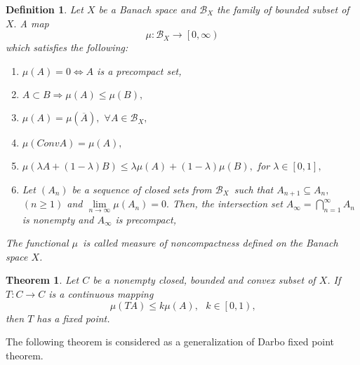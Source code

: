\documentclass{amsart}
\newtheorem{theorem}{Theorem}
\theoremstyle{plain}
\newtheorem{definition}{Definition}
\numberwithin{equation}{section}
\begin{document}
\begin{definition}
\cite{banas2} Let $X$ be a Banach space and $\mathcal{B}_{X}$ the family of
bounded subset of $X.$ A map\begin{equation*}
\mu :\mathcal{B}_{X}\rightarrow \left[ 0,\infty \right)
\end{equation*}
which satisfies the following:

\begin{enumerate}
\item $\mu \left( A\right) =0\Leftrightarrow A$ is a precompact set,

\item $A\subset B\Rightarrow \mu \left( A\right) \leqslant \mu \left(
B\right) ,$

\item $\mu \left( A\right) =\mu \left( \overline{A}\right) ,$ $\forall A\in 
\mathcal{B}_{X},$

\item $\mu \left( ConvA\right) =\mu \left( A\right) ,$

\item $\mu \left( \lambda A+\left( 1-\lambda \right) B\right) \leqslant
\lambda \mu \left( A\right) +\left( 1-\lambda \right) \mu \left( B\right) ,$
for $\lambda \in \left[ 0,1\right] ,$

\item Let $\left( A_{n}\right) $ be a sequence of closed sets from $\mathcal{B}_{X}$\ such that $A_{n+1}\subseteq A_{n},$ $\left( n\geqslant 1\right) $
and $\lim\limits_{n\rightarrow \infty }\mu \left( A_{n}\right) =0.$ Then,
the intersection set $A_{\infty }=\bigcap\limits_{n=1}^{\infty }A_{n}$ is
nonempty and $A_{\infty }$ is precompact,
\end{enumerate}

The functional $\mu $\ is called measure of noncompactness defined on the
Banach space $X$.
\end{definition}

\begin{theorem}
\cite{lec.note} Let $C$ be a nonempty closed, bounded and convex subset of $X $. If $T:C\rightarrow C$ is a continuous mapping 
\begin{equation*}
\mu \left( TA\right) \leqslant k\mu \left( A\right) ,\text{ \ }k\in \left[
0,1\right) \text{,}
\end{equation*}then $T$ has a fixed point.
\end{theorem}

The following theorem is considered as a generalization of Darbo fixed point
theorem.
\end{document}
